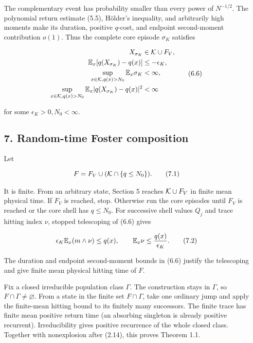 The complementary event has probability smaller than every power of
\(N^{-1/2}\). The polynomial return estimate (5.5), Hölder's inequality,
and arbitrarily high moments make its duration, positive \(q\)-cost, and
endpoint second-moment contribution \(o(1)\). Thus the complete core
episode \(\sigma_K\) satisfies

\[
\begin{split}
 X_{\sigma_K}&\in{\cal K}\cup F_V,\\
 \mathbb E_x[q(X_{\sigma_K})-q(x)]&\le-\epsilon_K,\\
 \sup_{x\in{\cal K},q(x)>N_0}\mathbb E_x\sigma_K&<\infty,\\
 \sup_{x\in{\cal K},q(x)>N_0}
 \mathbb E_x|q(X_{\sigma_K})-q(x)|^2&<\infty
\end{split}                                               \tag{6.6}
\]

for some \(\epsilon_K>0,N_0<\infty\).

\subsection{7. Random-time Foster
composition}

Let

\[
 F=F_V\cup({\cal K}\cap\{q\le N_0\}).                    \tag{7.1}
\]

It is finite. From an arbitrary state, Section 5 reaches
\({\cal K}\cup F_V\) in finite mean physical time. If \(F_V\) is
reached, stop. Otherwise run the core episodes until \(F_V\) is reached
or the core shell has \(q\le N_0\). For successive shell values \(Q_j\)
and trace hitting index \(\nu\), stopped telescoping of (6.6) gives

\[
 \epsilon_K\mathbb E_x(m\wedge\nu)\le q(x),\qquad
 \mathbb E_x\nu\le {q(x)\over\epsilon_K}.                 \tag{7.2}
\]

The duration and endpoint second-moment bounds in (6.6) justify the
telescoping and give finite mean physical hitting time of \(F\).

Fix a closed irreducible population class \(\Gamma\). The construction
stays in \(\Gamma\), so \(F\cap\Gamma\ne\varnothing\). From a state in
the finite set \(F\cap\Gamma\), take one ordinary jump and apply the
finite-mean hitting bound to its finitely many successors. The finite
trace has finite mean positive return time (an absorbing singleton is
already positive recurrent). Irreducibility gives positive recurrence of
the whole closed class. Together with nonexplosion after (2.14), this
proves Theorem 1.1.

